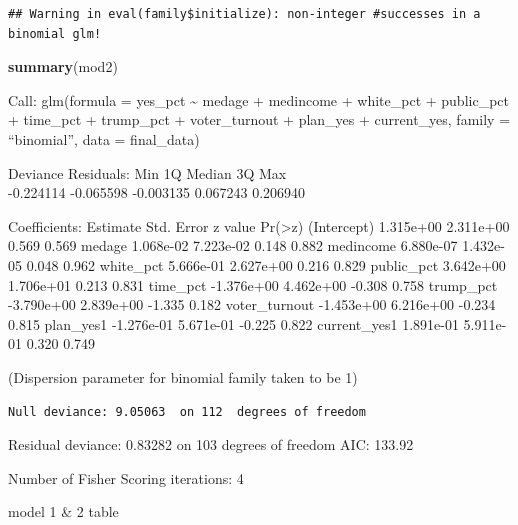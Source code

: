 \documentclass[
]{article}
\newenvironment{Shaded}{\begin{snugshade}}{\end{snugshade}}
\newcommand{\KeywordTok}[1]{\textcolor[rgb]{0.13,0.29,0.53}{\textbf{#1}}}
\newcommand{\NormalTok}[1]{#1}
\begin{document}
\begin{verbatim}
## Warning in eval(family$initialize): non-integer #successes in a binomial glm!
\end{verbatim}

\begin{Shaded}
\begin{Highlighting}[]
\KeywordTok{summary}\NormalTok{(mod2)}
\end{Highlighting}
\end{Shaded}

Call: glm(formula = yes\_pct \textasciitilde{} medage + medincome +
white\_pct + public\_pct + time\_pct + trump\_pct + voter\_turnout +
plan\_yes + current\_yes, family = ``binomial'', data = final\_data)

Deviance Residuals: Min 1Q Median 3Q Max\\
-0.224114 -0.065598 -0.003135 0.067243 0.206940

Coefficients: Estimate Std. Error z value
Pr(\textgreater\textbar z\textbar) (Intercept) 1.315e+00 2.311e+00 0.569
0.569 medage 1.068e-02 7.223e-02 0.148 0.882 medincome 6.880e-07
1.432e-05 0.048 0.962 white\_pct 5.666e-01 2.627e+00 0.216 0.829
public\_pct 3.642e+00 1.706e+01 0.213 0.831 time\_pct -1.376e+00
4.462e+00 -0.308 0.758 trump\_pct -3.790e+00 2.839e+00 -1.335 0.182
voter\_turnout -1.453e+00 6.216e+00 -0.234 0.815 plan\_yes1 -1.276e-01
5.671e-01 -0.225 0.822 current\_yes1 1.891e-01 5.911e-01 0.320 0.749

(Dispersion parameter for binomial family taken to be 1)

\begin{verbatim}
Null deviance: 9.05063  on 112  degrees of freedom
\end{verbatim}

Residual deviance: 0.83282 on 103 degrees of freedom AIC: 133.92

Number of Fisher Scoring iterations: 4

model 1 \& 2 table
\end{document}
